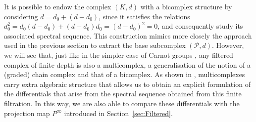 \documentclass[10pt]{amsart}
\theoremstyle{remark}
\numberwithin{equation}{section}
\begin{document}
It is possible to endow the complex $(K,d)$ with a bicomplex structure by considering $d=d_0+(d-d_0)$, since it satisfies the relations $d_0^2=d_0(d-d_0)+(d-d_0)d_0=(d-d_0)^2=0$, and consequently study its associated spectral sequence. This construction mimics more closely the approach used in the previous section to extract the base subcomplex $(\mathcal{P},d)$. However, we will see that, just like in the simpler case of Carnot groups \cite{lerario2023multicomplexes}, any filtered complex of finite depth is also a multicomplex, a generalisation of the notion of a (graded) chain complex and that of a bicomplex. As shown in \cite{livernet2020spectral}, multicomplexes carry extra algebraic structure that allows us to obtain an explicit formulation of the differentials that arise from the spectral sequence obtained from this finite filtration. In this way, we are also able to compare these differentials with the projection map $P^\infty$ introduced in Section~\ref{sec:Filtered}.
\end{document}
